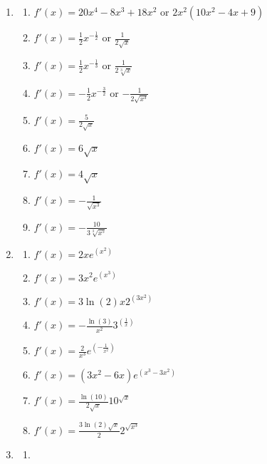 \documentclass[a4paper,12pt]{article}
\begin{document}
\begin{enumerate}
\item
    \begin{multicols}{2}
    \begin{enumerate}
    \item \spacer$f'(x) = 20x^4 - 8x^3 + 18x^2$ or $2x^2(10x^2 - 4x + 9)$
    \item \spacer$f'(x) = \frac{1}{2}x^{-\frac{1}{2}}$ or $\frac{1}{2\sqrt{x}}$
    \item \spacer$f'(x) = \frac{1}{2}x^{-\frac{1}{3}}$ or $\frac{1}{2\sqrt[3]{x}}$
    \item \spacer$f'(x) = -\frac{1}{2}x^{-\frac{3}{2}}$ or $-\frac{1}{2\sqrt{x^3}}$
    \item \spacer$f'(x) = \frac{5}{2\sqrt{x}}$
    \item \spacer$f'(x) = 6\sqrt{x}$
    \item \spacer$f'(x) = 4\sqrt{x}$
    \item \spacer$f'(x) = -\frac{1}{\sqrt{x^3}}$
    \item \spacer$f'(x) = -\frac{10}{3\sqrt[3]{x^5}}$
    \end{enumerate}
    \end{multicols}

\item
    \begin{multicols}{2}
    \begin{enumerate}
    \item \spacer$f'(x) = 2xe^{(x^2)}$
    \item \spacer$f'(x) = 3x^2e^{(x^3)}$
    \item \spacer$f'(x) = 3\ln(2)x2^{(3x^2)}$
    \item \spacer$f'(x) = -\frac{\ln(3)}{x^2}3^{(\frac{1}{x})}$
    \item \spacer$f'(x) = \frac{2}{x^3}e^{(-\frac{1}{x^2})}$
    \item \spacer$f'(x) = (3x^2 - 6x)e^{(x^3 - 3x^2)}$
    \item \spacer$f'(x) = \frac{\ln(10)}{2\sqrt{x}}10^{\sqrt{x}}$
    \item \spacer$f'(x) = \frac{3\ln(2)\sqrt{x}}{2}2^{\sqrt{x^3}}$
    \end{enumerate}
    \end{multicols}

\item
    \begin{multicols}{2}
    \begin{enumerate}
    \item
    \end{enumerate}
    \end{multicols}

\end{enumerate}
\end{document}
